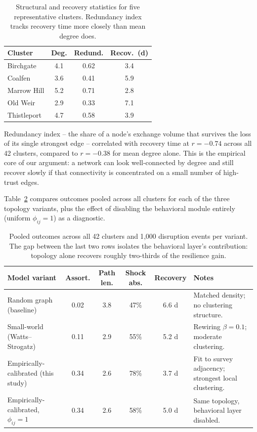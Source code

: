 \documentclass[10pt,twocolumn]{article}
\begin{document}
\begin{table}[h]
\centering
\small
\setlength{\tabcolsep}{3.5pt}
\begin{tabular}{lccc}
\toprule
\rowcolor{inkblue!10}
\textbf{Cluster} & \textbf{Deg.} & \textbf{Redund.} & \textbf{Recov.\ (d)} \\
\midrule
Birchgate    & 4.1 & 0.62 & 3.4 \\
Coalfen      & 3.6 & 0.41 & 5.9 \\
Marrow Hill  & 5.2 & 0.71 & 2.8 \\
Old Weir     & 2.9 & 0.33 & 7.1 \\
Thistleport  & 4.7 & 0.58 & 3.9 \\
\bottomrule
\end{tabular}
\caption{Structural and recovery statistics for five representative
clusters. Redundancy index tracks recovery time more closely than mean
degree does.}
\label{tab:clusters}
\end{table}

Redundancy index -- the share of a node's exchange volume that survives
the loss of its single strongest edge -- correlated with recovery time at
$r = -0.74$ across all 42 clusters, compared to $r = -0.38$ for mean
degree alone. This is the empirical core of our argument: a network can
look well-connected by degree and still recover slowly if that
connectivity is concentrated on a small number of high-trust edges.

Table~\ref{tab:variants} compares outcomes pooled across all clusters for
each of the three topology variants, plus the effect of disabling the
behavioral module entirely (uniform $\phi_{ij}=1$) as a diagnostic.

\begin{table}[t]
\centering
\small
\begin{tabularx}{\textwidth}{@{}X ccccX@{}}
\toprule
\rowcolor{inkblue!10}
\textbf{Model variant} & \textbf{Assort.} & \textbf{Path len.} & \textbf{Shock abs.} & \textbf{Recovery} & \textbf{Notes} \\
\midrule
Random graph (baseline) & 0.02 & 3.8 & 47\% & 6.6 d & Matched density; no clustering structure. \\
Small-world (Watts--Strogatz) & 0.11 & 2.9 & 55\% & 5.2 d & Rewiring $\beta = 0.1$; moderate clustering. \\
Empirically-calibrated (this study) & 0.34 & 2.6 & 78\% & 3.7 d & Fit to survey adjacency; strongest local clustering. \\
Empirically-calibrated, $\phi_{ij}=1$ & 0.34 & 2.6 & 58\% & 5.0 d & Same topology, behavioral layer disabled. \\
\bottomrule
\end{tabularx}
\caption{Pooled outcomes across all 42 clusters and 1{,}000 disruption events per variant. The gap between the last two rows isolates the behavioral layer's contribution: topology alone recovers roughly two-thirds of the resilience gain.}
\label{tab:variants}
\end{table}
\end{document}
